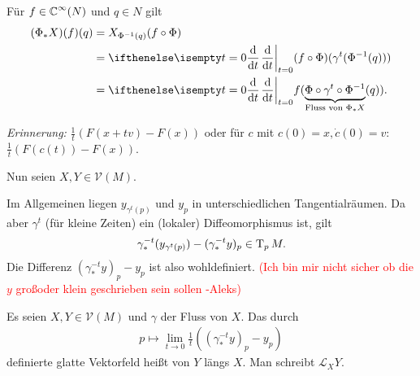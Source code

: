 \begin{bew}
Für $f \in \operatorname{\mathbb{C}}^{\infty}(N)$ und $q \in N$ gilt
\begin{align*}
	(\Phi_{\ast}X)(f)(q) & = X_{\Phi^{-1}(q)}(f \circ \Phi)\\
	& = \difffrac[t=0]{}{t} (f \circ \Phi)(\gamma^t(\Phi^{-1}(q)))\\
	& = \difffrac[t=0]{}{t}f(\underbrace{\Phi \circ \gamma^t \circ \Phi^{-1}}_{\text{Fluss von }\Phi_{*}X}(q)).
\end{align*}
\end{bew}

\emph{Erinnerung:} $\frac{1}t(F(x+tv)-F(x))$ oder für $c$ mit $c(0) = x, \dot c(0) = v$: $\frac{1}t(F(c(t))-F(x))$.

Nun seien $X,Y \in \mathcal V(M)$.
\begin{center}\end{center}
Im Allgemeinen liegen $y_{\gamma^t(p)}$ und $y_p$ in unterschiedlichen Tangentialräumen.
Da aber $\gamma^t$ (für kleine Zeiten) ein (lokaler) Diffeomorphismus ist, gilt
\begin{align*}
  \gamma_{*}^{-t}(y_{\gamma^t(p)})-(\gamma_{*}^{-t}y)_p \in \operatorname{T}_pM.
\end{align*}
Die Differenz $(\gamma_{*}^{-t}y)_p - y_p$ ist also wohldefiniert. \textcolor{red}{(Ich bin mir nicht sicher ob die $y$ gro\ss  oder klein geschrieben sein sollen -Aleks)}

\begin{Dfn}
  Es seien $X,Y \in \mathcal V(M)$ und $\gamma$ der Fluss von $X$.
Das durch 
\begin{align*}
  p \mapsto \lim_{t\to 0}\frac{1}t\left(\left(\gamma_{*}^{-t}y\right)_p-y_p\right)
\end{align*}
definierte glatte Vektorfeld heißt  von $Y$ längs $X$. Man schreibt $\mathcal L_XY$.
\end{Dfn}

